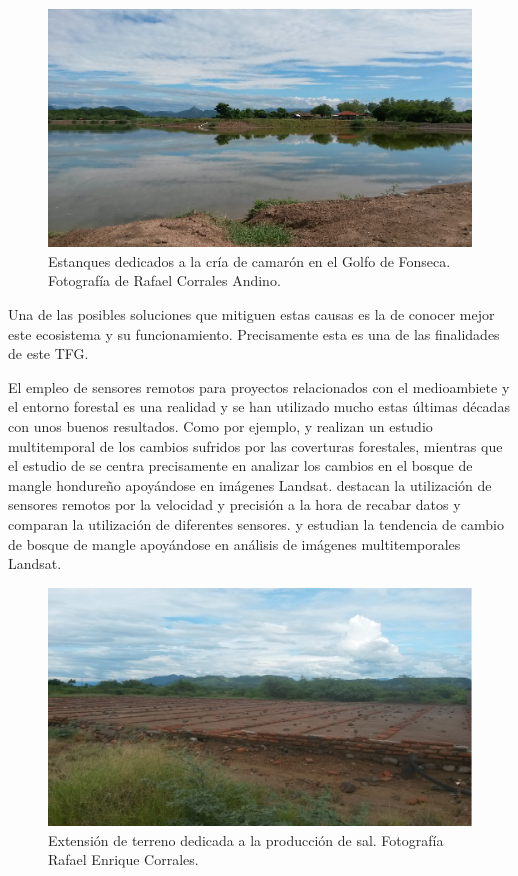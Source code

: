 \begin{figure}
	\centering
	\includegraphics[width=0.9\linewidth]{./Imagenes/Camaronera2.eps}
	\caption[Estanques de cría de camarón]{Estanques dedicados a la cría de camarón en el Golfo de Fonseca. Fotografía de Rafael Corrales Andino.}
	\label{fig:camaroneras}
\end{figure}

Una de las posibles soluciones que mitiguen estas causas es la de conocer mejor este ecosistema y su funcionamiento. Precisamente esta es una de las finalidades de este \ac{TFG}.%

El empleo de sensores remotos para proyectos relacionados con el medioambiete y el entorno forestal es una realidad y se han utilizado mucho estas últimas décadas con unos buenos resultados. Como por ejemplo, \cite{bodart2011pre} y \cite{cajacuri2011medicion} realizan un estudio multitemporal de los cambios sufridos por las coverturas forestales, mientras que el estudio de \cite{chen2013multi} se centra precisamente en analizar los cambios en el bosque de mangle hondureño apoyándose en imágenes Landsat. \cite{lee2009applying} destacan la utilización de sensores remotos por la velocidad y precisión a la hora de recabar datos y comparan la utilización de diferentes sensores. \cite{Berlanga-Robles2007} y \cite{CorbelleRico2013} estudian la tendencia de cambio de bosque de mangle apoyándose en análisis de imágenes multitemporales Landsat.%

\begin{figure}
	\centering
	\includegraphics[width=0.9\linewidth]{./Imagenes/Salineras.eps}
	\caption[Salineras]{Extensión de terreno dedicada a la producción de sal. Fotografía Rafael Enrique Corrales.}
	\label{fig:salinas}
\end{figure}

